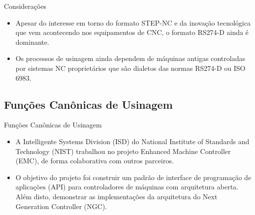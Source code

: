 \documentclass[aspectratio=169]{beamer}
\begin{document}
{\begin{frame}{Considerações}

  \begin{itemize}
    \item {
      Apesar do interesse em torno do formato STEP-NC e da inovação tecnológica
      que vem acontecendo nos equipamentos de CNC, o formato RS274-D ainda é dominante.
    }
    \item {
      Os processos de usinagem ainda dependem de máquinas antigas controladas
      por sistemas NC proprietários que são dialetos das normas RS274-D ou ISO 6983.
    }
  \end{itemize}   

\end{frame}


\subsection{Funções Canônicas de Usinagem}

\begin{frame}{Funções Canônicas de Usinagem}
  \begin{itemize}
    \item{
      A Intelligente Systems Division (ISD) do National Institute of 
      Standards and Technology (NIST) trabalhou no projeto 
      Enhanced Machine Controller (EMC), de forma colaborativa com 
      outros parceiros.
    }
    \item {
      O objetivo do projeto foi construir um padrão de interface de 
      programação de aplicações (API) para controladores de máquinas 
      com arquitetura aberta. 
      Além disto, demonstrar as implementações da arquitetura do 
      Next Generation Controller (NGC).
    }
  \end{itemize}
\end{frame}


}
\end{document}
